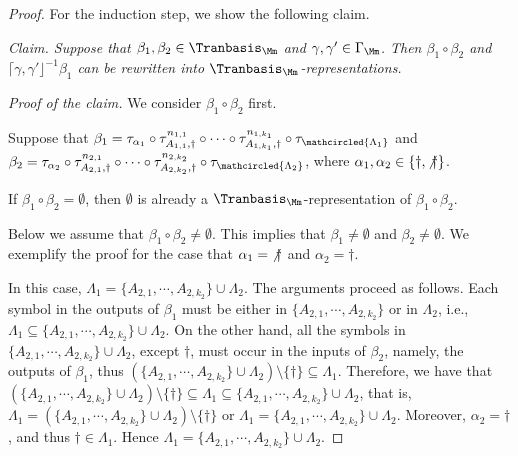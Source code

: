 \begin{proof}
	For the induction step, we show the following claim. 
	
	\noindent \emph{Claim. Suppose that $\beta_1, \beta_2 \in \Tranbasis_\Mm$ and $\gamma, \gamma' \in \Gamma_\Mm$. Then $\beta_1 \circ \beta_2$ and $\lceil \gamma, \gamma' \rfloor^{-1}\beta_1$ can be rewritten into $\Tranbasis_\Mm$-representations.}
	
	\smallskip
	
	\noindent \emph{Proof of the claim.}
	We consider $\beta_1 \circ \beta_2$ first.

	Suppose that $\beta_1 = \tau_{\alpha_1} \circ \tau^{n_{1,1}}_{A_{1,1}, \dag} \circ \cdots \circ \tau^{n_{1, k_1}}_{A_{1,k_1}, \dag} \circ \tau_{\mathcircled{\Lambda_1}}$ and $\beta_2 = \tau_{\alpha_2} \circ \tau^{n_{2,1}}_{A_{2,1}, \dag} \circ \cdots \circ \tau^{n_{2, k_2}}_{A_{2,k_2}, \dag} \circ \tau_{\mathcircled{\Lambda_2}}$, where $\alpha_1, \alpha_2 \in \{\dag, \not \dag\}$.
	
	If $\beta_1 \circ \beta_2 = \emptyset$, then $\emptyset$ is already a $\Tranbasis_\Mm$-representation of $\beta_1 \circ \beta_2$. 
	
	Below we assume that $\beta_1 \circ \beta_2 \neq \emptyset$. This implies that $\beta_1 \neq \emptyset$ and $\beta_2 \neq \emptyset$.
	We exemplify the proof for the case that $\alpha_1 = {\not \dag}$ and  $\alpha_2 = \dag$.
	
	In this case, $\Lambda_1 =  \{A_{2,1}, \cdots, A_{2, k_2}\} \cup \Lambda_2$. The arguments proceed as follows. 
	Each symbol in the outputs of $\beta_1$ must be either in $\{A_{2,1}, \cdots, A_{2, k_2}\}$ or in $\Lambda_2$, i.e., $\Lambda_1 \subseteq   \{A_{2,1}, \cdots, A_{2, k_2}\} \cup \Lambda_2$. On the other hand, all the symbols in $\{A_{2,1}, \cdots, A_{2, k_2}\} \cup \Lambda_2$, except $\dag$, must occur in the inputs of $\beta_2$, namely, the outputs of $\beta_1$, thus  $(\{A_{2,1}, \cdots, A_{2, k_2}\} \cup \Lambda_2) \setminus \{\dag\} \subseteq \Lambda_1$.
	Therefore, we have that
	$(\{A_{2,1}, \cdots, A_{2, k_2}\} \cup \Lambda_2) \setminus \{\dag\} \subseteq \Lambda_1 \subseteq  \{A_{2,1}, \cdots, A_{2, k_2}\} \cup \Lambda_2$, that is, $\Lambda_1 = (\{A_{2,1}, \cdots, A_{2, k_2}\} \cup \Lambda_2) \setminus \{\dag\}$ or $\Lambda_1 =  \{A_{2,1}, \cdots, A_{2, k_2}\} \cup \Lambda_2$.
	Moreover, $\alpha_2 = \dag$, and thus $\dag \in \Lambda_1$. Hence  $\Lambda_1 =  \{A_{2,1}, \cdots, A_{2, k_2}\} \cup \Lambda_2$.
	

\end{proof}
